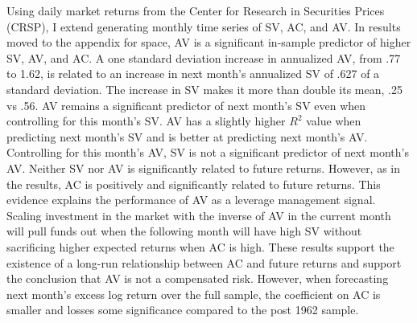 Using daily market returns from the Center for Research in Securities Prices (CRSP), I extend \citet{pollet_average_2010} generating monthly time series of SV, AC, and AV. In results moved to the appendix for space, AV is a significant in-sample predictor of higher SV, AV, and AC.  A one standard deviation increase in annualized AV, from .77 to 1.62, is related to an increase in next month’s annualized SV of .627 of a standard deviation. The increase in SV makes it more than double its mean, .25 vs .56. AV remains a significant predictor of next month’s SV even when controlling for this month's SV. AV has a slightly higher $R^{2}$ value when predicting next month's SV and is better at predicting next month's AV. Controlling for this month's AV, SV is not a significant predictor of next month's AV. Neither SV nor AV is significantly related to future returns. However, as in the \citet{pollet_average_2010} results, AC is positively and significantly related to future returns. %
This evidence explains the performance of AV as a leverage management signal. Scaling investment in the market with the inverse of AV in the current month will pull funds out when the following month will have high SV without sacrificing higher expected returns when AC is high. 
These results support the existence of a long-run relationship between AC and future returns and support the conclusion that AV is not a compensated risk. However, when forecasting next month's excess log return over the full sample, the coefficient on AC is smaller and losses some significance compared to the post 1962 sample. 

